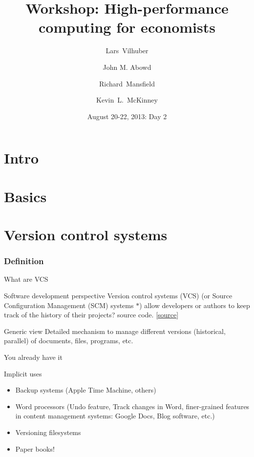 \documentclass[xcolor=table,compress]{beamer}
\title[Computing for Economists]{Workshop: High-performance computing for economists}
\author[Vilhuber, Abowd, Mansfield, McKinney]{%
  Lars~Vilhuber\inst{1} \and
  John M. Abowd\inst{1} \and
  Richard~Mansfield\inst{1} \and
  Kevin~L.~McKinney %
}
\institute[Cornell]{
  \inst{1}%
   Cornell University, Economics Department,
}%
\date[August 20-22, 2013]{August 20-22, 2013: Day 2}
\begin{document}
\frame{\titlepage}
\section{Intro}
\section{Basics}
\section[VCS]{Version control systems}


\subsubsection{Definition}

\begin{frame}{What are VCS}
\begin{block}{Software development perspective}
Version control systems (VCS) (or Source Configuration Management (SCM) systems $*$) allow developers or authors to keep track of the history of their projects? source code. [\href{http://better-scm.shlomifish.org/}{source}]

\end{block}
\pause
\begin{block}{Generic view}
Detailed mechanism to manage different versions (historical, parallel) of documents, files, programs, etc.
\end{block}
\end{frame}



\begin{frame}{You already have it}
\begin{block}{Implicit uses}
\begin{itemize}
\item Backup systems (Apple Time Machine, others)
\item Word processors (Undo feature, Track changes in Word, finer-grained features in content management systems: Google Docs, Blog software, etc.)
\item Versioning filesystems
\item Paper books!
\end{itemize}
\end{block}
\end{frame}
\end{document}
